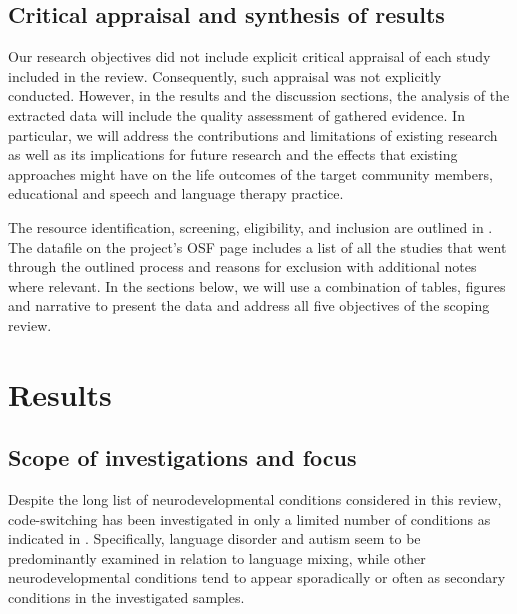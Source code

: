 \documentclass[output=paper]{langscibook}
\begin{document}
\subsection{Critical appraisal and synthesis of results}

Our research objectives did not include explicit critical appraisal of each study included in the review. Consequently, such appraisal was not explicitly conducted. However, in the results and the discussion sections, the analysis of the extracted data will include the quality assessment of gathered evidence. In particular, we will address the contributions and limitations of existing research as well as its implications for future research and the effects that existing approaches might have on the life outcomes of the target community members, educational and speech and language therapy practice.

The resource identification, screening, eligibility, and inclusion are outlined in . The datafile on the project's OSF page includes a list of all the studies that went through the outlined process and reasons for exclusion with additional notes where relevant. In the sections below, we will use a combination of tables, figures and narrative to present the data and address all five objectives of the scoping review.

\section{Results}

\subsection{Scope of investigations and focus}

Despite the long list of neurodevelopmental conditions considered in this review, code-switching has been investigated in only a limited number of conditions as indicated in . Specifically, language disorder and autism seem to be predominantly examined in relation to language mixing, while other neurodevelopmental conditions tend to appear sporadically or often as secondary conditions in the investigated samples.
\end{document}
